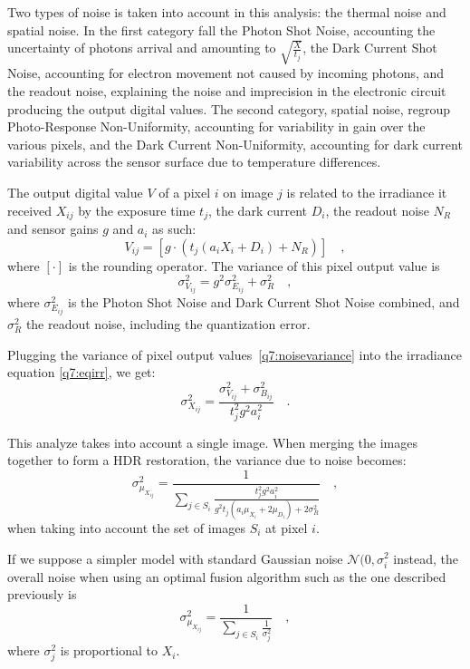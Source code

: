 \documentclass{report}
\begin{document}
Two types of noise is taken into account in this analysis: the thermal noise and spatial noise. In the first category fall the Photon Shot Noise, accounting the uncertainty of photons arrival and amounting to $\sqrt{\frac{X}{t_j}}$, the Dark Current Shot Noise, accounting for electron movement not caused by incoming photons, and the readout noise, explaining the noise and imprecision in the electronic circuit producing the output digital values. The second category, spatial noise, regroup Photo-Response Non-Uniformity, accounting for variability in gain over the various pixels, and the Dark Current Non-Uniformity, accounting for dark current variability across the sensor surface due to temperature differences.

The output digital value $V$ of a pixel $i$ on image $j$ is related to the irradiance it received $X_{ij}$ by the exposure time $t_j$, the dark current $D_i$, the readout noise $N_R$ and sensor gains $g$ and $a_i$ as such:
\begin{equation}
V_{ij} = \left[ g \cdot \left( t_j \left( a_i X_i + D_i \right ) + N_R\right) \right] \quad,
\end{equation}
where $\left[ \cdot \right]$ is the rounding operator. The variance of this pixel output value is
\begin{equation}
\label{q7:noisevariance}
\sigma_{V_{ij}}^2 = g^2 \sigma_{E_{ij}}^2 + \sigma_R^2
\quad,
\end{equation}
where $\sigma_{E_{ij}}^2$ is the Photon Shot Noise and Dark Current Shot Noise combined, and $\sigma_R^2$ the readout noise, including the quantization error.

Plugging the variance of pixel output values~\eqref{q7:noisevariance} into the irradiance equation \eqref{q7:eqirr}, we get:
\begin{equation}
\sigma_{X_{ij}}^2 = \frac{\sigma_{V_{ij}}^2 + \sigma_{B_{ij}}^2}{t_j^2 g^2 a_i^2} \quad.
\end{equation}

This analyze takes into account a single image. When merging the images together to form a HDR restoration, the variance due to noise becomes:
\begin{equation}
\sigma_{\mu_{X_{ij}}}^2 = \frac{1}{\sum_{j \in S_i} \frac{t_j^2 g^2 a_i^2}{g^2 t_j \left( a_i \mu_{X_i} + 2 \mu_{D_i} \right) + 2 \sigma_R^2}} \quad,
\end{equation}
when taking into account the set of images $S_i$ at pixel $i$.

If we suppose a simpler model with standard Gaussian noise $\mathcal{N}(0,\sigma_i^2$ instead, the overall noise when using an optimal fusion algorithm such as the one described previously is
\begin{equation}
\sigma_{\mu_{X_{ij}}}^2 = \frac{1}{\sum_{j \in S_i} \frac{1}{\sigma_j^2}}
\quad,
\end{equation}
where $\sigma_j^2$ is proportional to $X_i$.
\end{document}
